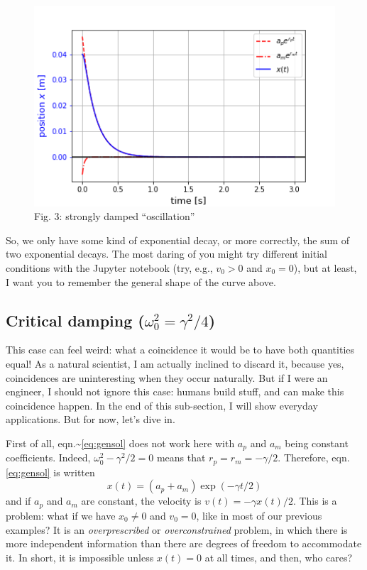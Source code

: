 \documentclass[11pt]{article}
\makeatletter
\def\maxwidth{\ifdim\Gin@nat@width>\linewidth\linewidth
    \else\Gin@nat@width\fi}
\let\Oldincludegraphics\includegraphics
\renewcommand{\includegraphics}[1]{\Oldincludegraphics[width=.8\maxwidth]{#1}}
\makeatother
\begin{document}
    \begin{figure}
\centering
\includegraphics{StronglyDampedOscillations.png}
\caption{Fig. 3: strongly damped ``oscillation''}
\end{figure}

    So, we only have some kind of exponential decay, or more correctly, the
sum of two exponential decays. The most daring of you might try
different initial conditions with the Jupyter notebook (try, e.g.,
\(v_0 > 0\) and \(x_0 = 0\)), but at least, I want you to remember the
general shape of the curve above.

    \hypertarget{critical-damping-omega_02-gamma24}{%
\subsection{\texorpdfstring{Critical damping
(\(\omega_0^2 = \gamma^2/4\))}{Critical damping (\textbackslash{}omega\_0\^{}2 = \textbackslash{}gamma\^{}2/4)}}\label{critical-damping-omega_02-gamma24}}

This case can feel weird: what a coincidence it would be to have both
quantities equal! As a natural scientist, I am actually inclined to
discard it, because yes, coincidences are uninteresting when they occur
naturally. But if I were an engineer, I should not ignore this case:
humans build stuff, and can make this coincidence happen. In the end of
this sub-section, I will show everyday applications. But for now, let's
dive in.

    First of all, eqn.\textasciitilde{}\eqref{eq:gensol} does not work here
with \(a_p\) and \(a_m\) being constant coefficients. Indeed,
\(\omega^2_0 - \gamma^2/2 = 0\) means that \(r_p = r_m = -\gamma/2\).
Therefore, eqn. \eqref{eq:gensol} is written
\[ x(t) = (a_p + a_m)\exp(-\gamma t/2) \] and if \(a_p\) and \(a_m\) are
constant, the velocity is \(v(t) = -\gamma x(t)/2\). This is a problem:
what if we have \(x_0 \neq 0\) and \(v_0 = 0\), like in most of our
previous examples? It is an \emph{overprescribed} or
\emph{overconstrained} problem, in which there is more independent
information than there are degrees of freedom to accommodate it. In
short, it is impossible unless \(x(t) = 0\) at all times, and then, who
cares?
\end{document}

